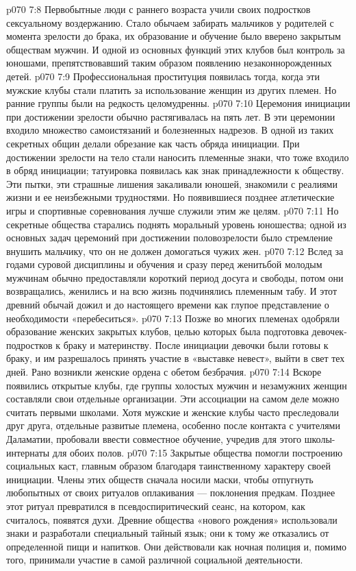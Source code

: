 \vs p070 7:8 \pc Первобытные люди с раннего возраста учили своих подростков сексуальному воздержанию. Стало обычаем забирать мальчиков у родителей с момента зрелости до брака, их образование и обучение было вверено закрытым обществам мужчин. И одной из основных функций этих клубов был контроль за юношами, препятствовавший таким образом появлению незаконнорожденных детей.
\vs p070 7:9 Профессиональная проституция появилась тогда, когда эти мужские клубы стали платить за использование женщин из других племен. Но ранние группы были на редкость целомудренны.
\vs p070 7:10 Церемония инициации при достижении зрелости обычно растягивалась на пять лет. В эти церемонии входило множество самоистязаний и болезненных надрезов. В одной из таких секретных общин делали обрезание как часть обряда инициации. При достижении зрелости на тело стали наносить племенные знаки, что тоже входило в обряд инициации; татуировка появилась как знак принадлежности к обществу. Эти пытки, эти страшные лишения закаливали юношей, знакомили с реалиями жизни и ее неизбежными трудностями. Но появившиеся позднее атлетические игры и спортивные соревнования лучше служили этим же целям.
\vs p070 7:11 Но секретные общества старались поднять моральный уровень юношества; одной из основных задач церемоний при достижении половозрелости было стремление внушить мальчику, что он не должен домогаться чужих жен.
\vs p070 7:12 Вслед за годами суровой дисциплины и обучения и сразу перед женитьбой молодым мужчинам обычно предоставляли короткий период досуга и свободы, потом они возвращались, женились и на всю жизнь подчинялись племенным табу. И этот древний обычай дожил и до настоящего времени как глупое представление о необходимости «перебеситься».
\vs p070 7:13 \pc Позже во многих племенах одобряли образование женских закрытых клубов, целью которых была подготовка девочек\hyp{}подростков к браку и материнству. После инициации девочки были готовы к браку, и им разрешалось принять участие в «выставке невест», выйти в свет тех дней. Рано возникли женские ордена с обетом безбрачия.
\vs p070 7:14 Вскоре появились открытые клубы, где группы холостых мужчин и незамужних женщин составляли свои отдельные организации. Эти ассоциации на самом деле можно считать первыми школами. Хотя мужские и женские клубы часто преследовали друг друга, отдельные развитые племена, особенно после контакта с учителями Даламатии, пробовали ввести совместное обучение, учредив для этого школы\hyp{}интернаты для обоих полов.
\vs p070 7:15 \pc Закрытые общества помогли построению социальных каст, главным образом благодаря таинственному характеру своей инициации. Члены этих обществ сначала носили маски, чтобы отпугнуть любопытных от своих ритуалов оплакивания --- поклонения предкам. Позднее этот ритуал превратился в псевдоспиритический сеанс, на котором, как считалось, появятся духи. Древние общества «нового рождения» использовали знаки и разработали специальный тайный язык; они к тому же отказались от определенной пищи и напитков. Они действовали как ночная полиция и, помимо того, принимали участие в самой различной социальной деятельности.
